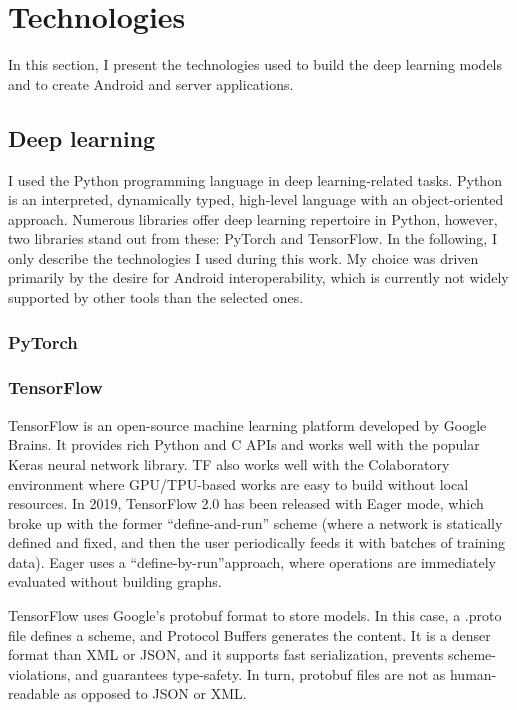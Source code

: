 \chapter{Technologies}

In this section, I present the technologies used to build the deep learning models and to create Android and server applications.

\section{Deep learning}

I used the Python\cite{Python} programming language in deep learning-related tasks. Python is an interpreted, dynamically typed, high-level language with an object-oriented approach. Numerous libraries offer deep learning repertoire in Python, however, two libraries stand out from these: PyTorch and TensorFlow. In the following, I only describe the technologies I used during this work. My choice was driven primarily by the desire for Android interoperability, which is currently not widely supported by other tools than the selected ones.

\subsection{PyTorch}

\subsection{TensorFlow}

TensorFlow is an open-source machine learning platform developed by Google Brains. It provides rich Python and C APIs and works well with the popular Keras neural network library. TF also works well with the Colaboratory environment where GPU/TPU-based works are easy to build without local resources. In 2019, TensorFlow 2.0 has been released with Eager mode, which broke up with the former “define-and-run” scheme (where a network is statically defined and fixed, and then the user periodically feeds it with batches of training data). Eager uses a “define-by-run”approach\cite{TensorFlowEager}, where operations are immediately evaluated without building graphs.

TensorFlow uses Google’s protobuf\cite{Protobuf} format to store models. In this case, a .proto file defines a scheme, and Protocol Buffers generates the content. It is a denser format than XML or JSON, and it supports fast serialization, prevents scheme-violations, and guarantees type-safety\cite{ProtobufVsFlatbuf}. In turn, protobuf files are not as human-readable as opposed to JSON or XML.

